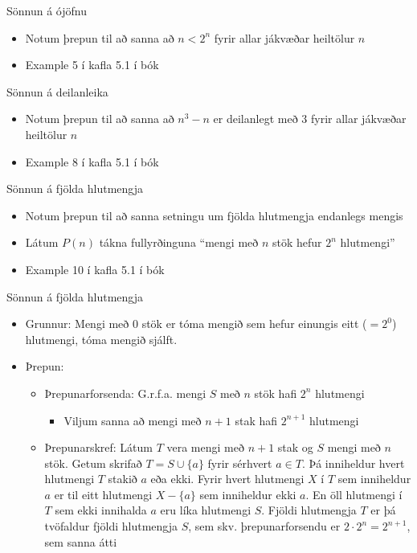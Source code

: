 \documentclass[handout]{beamer}
\begin{document}
\begin{frame}{Sönnun á ójöfnu}
    \begin{itemize}
        \item Notum þrepun til að sanna að $n < 2^n$ fyrir allar jákvæðar heiltölur $n$
        \item Example 5 í kafla 5.1 í bók
    \end{itemize}
\end{frame}

\begin{frame}{Sönnun á deilanleika}
    \begin{itemize}
        \item Notum þrepun til að sanna að $n^3-n$ er deilanlegt með 3 fyrir allar jákvæðar heiltölur $n$
        \item Example 8 í kafla 5.1 í bók
    \end{itemize}
\end{frame}

\begin{frame}{Sönnun á fjölda hlutmengja}
    \begin{itemize}
        \item Notum þrepun til að sanna setningu um fjölda hlutmengja endanlegs mengis
        \item Látum $P(n)$ tákna fullyrðinguna ``mengi með $n$ stök hefur $2^n$ hlutmengi''
        \item Example 10 í kafla 5.1 í bók
    \end{itemize}
\end{frame}

\begin{frame}{Sönnun á fjölda hlutmengja}
    \begin{itemize}
        \item Grunnur: Mengi með 0 stök er tóma mengið sem hefur einungis eitt ($=2^0$) hlutmengi, tóma mengið sjálft.
        \item Þrepun:
        \begin{itemize}
            \item Þrepunarforsenda: G.r.f.a. mengi $S$ með $n$ stök hafi $2^n$ hlutmengi
            \begin{itemize}
                \item Viljum sanna að mengi með $n+1$ stak hafi $2^{n+1}$ hlutmengi
            \end{itemize}
            \item Þrepunarskref: Látum $T$ vera mengi með $n+1$ stak og $S$ mengi með $n$ stök. Getum skrifað $T = S \cup \{a\}$ fyrir sérhvert $a \in T$. Þá inniheldur hvert hlutmengi $T$ stakið $a$ eða ekki. Fyrir hvert hlutmengi $X$ í $T$ sem inniheldur $a$ er til eitt hlutmengi $X - \{a\}$ sem inniheldur ekki $a$. En öll hlutmengi í $T$ sem ekki innihalda $a$ eru líka hlutmengi $S$. Fjöldi hlutmengja $T$ er þá tvöfaldur fjöldi hlutmengja $S$, sem skv. þrepunarforsendu er $2 \cdot 2^n = 2^{n+1}$, sem sanna átti 
        \end{itemize}
    \end{itemize}
\end{frame}
\end{document}
